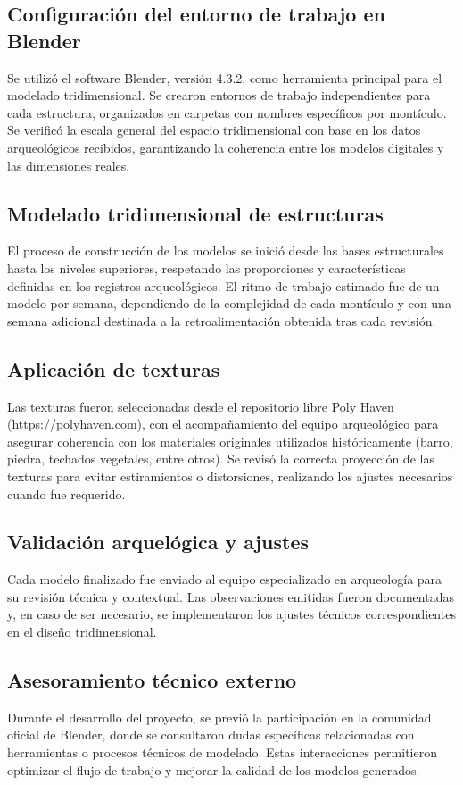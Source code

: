 \subsection{Configuración del entorno de trabajo en Blender}
Se utilizó el software Blender, versión 4.3.2, como herramienta principal para el modelado tridimensional. Se crearon entornos de trabajo independientes para cada estructura, organizados en carpetas con nombres específicos por montículo. Se verificó la escala general del espacio tridimensional con base en los datos arqueológicos recibidos, garantizando la coherencia entre los modelos digitales y las dimensiones reales.

\subsection{Modelado tridimensional de estructuras}
El proceso de construcción de los modelos se inició desde las bases estructurales hasta los niveles superiores, respetando las proporciones y características definidas en los registros arqueológicos. El ritmo de trabajo estimado fue de un modelo por semana, dependiendo de la complejidad de cada montículo y con una semana adicional destinada a la retroalimentación obtenida tras cada revisión.

\subsection{Aplicación de texturas}
Las texturas fueron seleccionadas desde el repositorio libre Poly Haven (https://polyhaven.com), con el acompañamiento del equipo arqueológico para asegurar coherencia con los materiales originales utilizados históricamente (barro, piedra, techados vegetales, entre otros). Se revisó la correcta proyección de las texturas para evitar estiramientos o distorsiones, realizando los ajustes necesarios cuando fue requerido.

\subsection{Validación arquelógica y ajustes}
Cada modelo finalizado fue enviado al equipo especializado en arqueología para su revisión técnica y contextual. Las observaciones emitidas fueron documentadas y, en caso de ser necesario, se implementaron los ajustes técnicos correspondientes en el diseño tridimensional.

\subsection{Asesoramiento técnico externo}
Durante el desarrollo del proyecto, se previó la participación en la comunidad oficial de Blender, donde se consultaron dudas específicas relacionadas con herramientas o procesos técnicos de modelado. Estas interacciones permitieron optimizar el flujo de trabajo y mejorar la calidad de los modelos generados.

